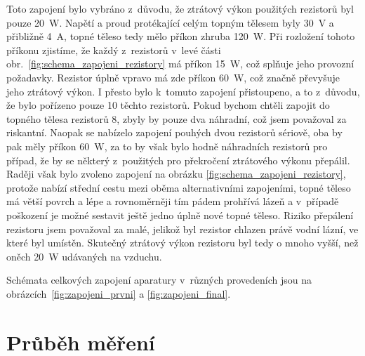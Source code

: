 \documentclass[12pt]{article}
\begin{document}
Toto zapojení bylo vybráno z~důvodu, že ztrátový výkon použitých rezistorů byl pouze \SI{20}{\watt}. Napětí a proud protékající celým topným tělesem byly \SI{30}{\volt} a přibližně \SI{4}{\ampere}, topné těleso tedy mělo příkon zhruba \SI{120}{\watt}. Při rozložení tohoto příkonu zjistíme, že každý z~rezistorů v~levé části obr.~\ref{fig:schema_zapojeni_rezistory} má příkon \SI{15}{\watt}, což splňuje jeho provozní požadavky. Rezistor úplně vpravo má zde příkon \SI{60}{\watt}, což značně převyšuje jeho ztrátový výkon. I přesto bylo k~tomuto zapojení přistoupeno, a to z~důvodu, že bylo pořízeno pouze 10 těchto rezistorů. Pokud bychom chtěli zapojit do topného tělesa rezistorů 8, zbyly by pouze dva náhradní, což jsem považoval za riskantní. Naopak se nabízelo zapojení pouhých dvou rezistorů sériově, oba by pak měly příkon \SI{60}{\watt}, za to by však bylo hodně náhradních rezistorů pro případ, že by se některý z~použitých pro překročení ztrátového výkonu přepálil. Raději však bylo zvoleno zapojení na obrázku \ref{fig:schema_zapojeni_rezistory}, protože nabízí střední cestu mezi oběma alternativními zapojeními, topné těleso má větší povrch a lépe a rovnoměrněji tím pádem prohřívá lázeň a v~případě poškození je možné sestavit ještě jedno úplně nové topné těleso. Riziko přepálení rezistoru jsem považoval za malé, jelikož byl rezistor chlazen právě vodní lázní, ve které byl umístěn. Skutečný ztrátový výkon rezistoru byl tedy o mnoho vyšší, než oněch \SI{20}{\watt} udávaných na vzduchu.
\par\noindent
Schémata celkových zapojení aparatury v~různých provedeních jsou na obrázcích~\ref{fig:zapojeni_prvni} a \ref{fig:zapojeni_final}.

\newpage%
\section{Průběh měření}%
\end{document}

